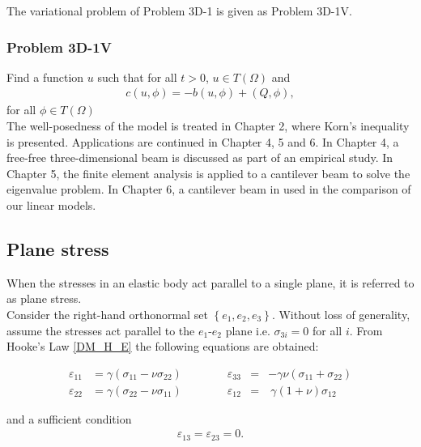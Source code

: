 \documentclass[../../main.tex]{subfiles}
\begin{document}
The variational problem of Problem 3D-1 is given as Problem 3D-1V.

\subsubsection{Problem 3D-1V}\label{sssec:3D_Model:Problem3D1V}
Find a function $u$ such that for all $t>0$, $u \in T(\Omega)$ and
\begin{align}
	c(u,\phi) = -b(u,\phi) + (Q,\phi), \label{eq:3D_Model:Problem3D1VEq}
\end{align}\label{sym:c}
for all $\phi \in T(\Omega)$\\

The well-posedness of the model is treated in Chapter 2, where Korn's
inequality is presented. Applications are continued in Chapter 4, 5 and 6. In
Chapter 4, a free-free three-dimensional beam is discussed as part of an
empirical study. In Chapter 5, the finite element analysis is applied to a
cantilever beam to solve the eigenvalue problem. In Chapter 6, a cantilever
beam in used in the comparison of our linear models.

\subsection{Plane stress}\label{ssec:3D_Model:PlaneStress}
When the stresses in an elastic body act parallel to a single plane, it is
referred to as plane stress.\\

Consider the right-hand orthonormal set $\left\{e_1, e_2, e_3\right\}$. Without
loss of generality, assume the stresses act parallel to the $e_1$-$e_2$ plane
i.e. $\sigma_{3i} = 0$ for all $i$. From Hooke's Law \eqref{DM_H_E} the
following equations are obtained: \label{sym:e_i}

\begin{equation}
	\begin{aligned}
		\varepsilon_{11} & =  \gamma  ( \sigma_{11} - \nu \sigma_{22}) \qquad \qquad \varepsilon_{33} & = & - \gamma \nu (\sigma_{11} + \sigma_{22})          \\
		\varepsilon_{22} & =   \gamma (\sigma_{22} - \nu\sigma_{11}) \qquad \qquad \varepsilon_{12}   & = & \  \gamma (1+\nu) \sigma_{12} \label{strain_comp}
	\end{aligned}
\end{equation}

and a sufficient condition
\begin{eqnarray}
	\varepsilon_{13} =  \varepsilon_{23} = 0.
\end{eqnarray}
\end{document}
